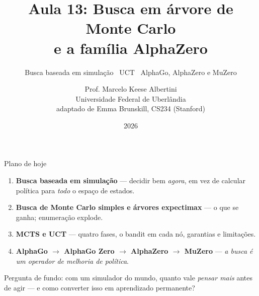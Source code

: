 \documentclass[aspectratio=169, 11pt]{beamer}
\title[Aula 13 — MCTS e AlphaZero]{Aula 13: Busca em árvore de Monte Carlo\\ e a família AlphaZero}
\subtitle[Aprendizagem por Reforço]{Busca baseada em simulação \textbullet\ UCT \textbullet\ AlphaGo, AlphaZero e MuZero}
\author[Prof. Marcelo K. Albertini]{Prof. Marcelo Keese Albertini \\
  \footnotesize Universidade Federal de Uberlândia \\
  \footnotesize adaptado de Emma Brunskill, CS234 (Stanford)}
\institute{Universidade Federal de Uberlândia}
\date{2026}
\begin{document}
\begin{frame}\titlepage\end{frame}

\begin{frame}{Plano de hoje}
  \begin{enumerate}
    \item \textbf{Busca baseada em simulação} — decidir bem \emph{agora}, em vez
          de calcular política para \emph{todo} o espaço de estados.
    \item \textbf{Busca de Monte Carlo simples e árvores expectimax} — o que se
          ganha; enumeração explode.
    \item \textbf{MCTS e UCT} — quatro fases, o bandit em cada nó,
          garantias e limitações.
    \item \textbf{AlphaGo $\to$ AlphaGo Zero $\to$ AlphaZero $\to$ MuZero} — \emph{a busca é um operador de melhoria de política}.
  \end{enumerate}

  \vfill
  \begin{ideiabox}
    Pergunta de fundo: com um simulador do mundo, quanto vale \emph{pensar mais} antes de agir --- e como converter isso em aprendizado permanente?
  \end{ideiabox}
\end{frame}
\end{document}
